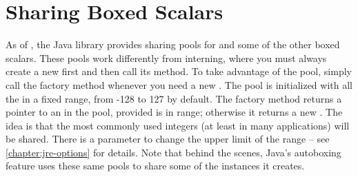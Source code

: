 \section{Sharing Boxed Scalars}

As of \javafive, the Java library provides sharing pools for
 and some of the other boxed scalars. These pools
work differently from  interning, where you must always create a
new  first and then call its  method. To take
advantage of the  pool, simply call the factory method
 whenever you need a new .
The  pool is initialized with all the  in a fixed
range, from -128 to 127 by default. The factory method returns a
pointer to an  in the pool, provided  is in
range; otherwise it returns a new . 
The idea is  that the most commonly
used integers (at least in many applications) will be shared. There is a
parameter to change the upper limit of the range -- see
\autoref{chapter:jre-options} for details. Note that
behind the scenes, Java's autoboxing feature uses these same pools
to share some of the instances it creates.



